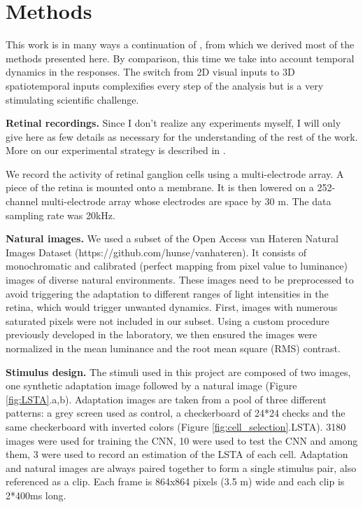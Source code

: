 \section{Methods}\label{sec:methods}

This work is in many ways a continuation of
\cite{goldin_context-dependent_2022}, from which we derived most of the methods
presented here. By comparison, this time we take into account temporal dynamics
in the responses. The switch from 2D visual inputs to 3D spatiotemporal inputs
complexifies every step of the analysis but is a very stimulating scientific
challenge.

\textbf{Retinal recordings.}
Since I don't realize any experiments myself, I will only give here as few
details as necessary for the understanding of the rest of the work. More on our
experimental strategy is described in \cite{goldin_context-dependent_2022}.

We record the activity of retinal ganglion
cells using a multi-electrode array. A piece of the retina is mounted onto a
membrane. It is then lowered on a 252-channel multi-electrode array whose
electrodes are space by 30 \textmu m.
The data sampling rate was 20kHz.

\textbf{Natural images.}
We used a subset of the Open Access van Hateren Natural Images Dataset
(https://github.com/hunse/vanhateren). It consists of monochromatic and
calibrated (perfect mapping from
pixel
value to luminance) images of diverse natural environments. These images need
to
be preprocessed to avoid triggering the adaptation to different ranges of light
intensities in the retina, which would trigger unwanted
dynamics. First, images with numerous saturated pixels were not included in our
subset. Using a custom procedure previously developed in the laboratory, we
then
ensured the images were normalized in the mean luminance and the root mean
square (RMS) contrast.

\textbf{Stimulus design.}
The stimuli used in this project are composed of two images, one synthetic
adaptation image followed by a natural image (Figure \ref{fig:LSTA}.a,b).
Adaptation images are taken from
a pool of three different patterns: a grey screen used as control,
a checkerboard of 24*24 checks and the same checkerboard with inverted colors
(Figure \ref{fig:cell_selection}.LSTA). 3180 images were used for
training the CNN, 10 were used to test the CNN and among them, 3 were used to
record an estimation of the LSTA of each cell.
Adaptation and natural images are always paired together to form a single
stimulus pair, also referenced as a clip. Each frame is 864x864 pixels (3.5
\textmu m) wide and each clip is 2*400ms long. %

